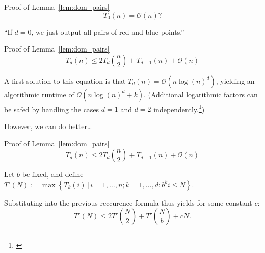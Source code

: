 \begin{frame}{Proof of Lemma~\ref{lem:dom_pairs}}
    \[
        T_0(n) = \mathcal{O}\left( n \right)?
    \]

    ``If $d = 0$, we just output all pairs of red and blue points.''


\end{frame}

\begin{frame}{Proof of Lemma~\ref{lem:dom_pairs}}
    \[
        T_d(n) \leq 2 T_d\left( \frac{n}{2} \right) + T_{d - 1}(n) + \mathcal{O}(n)
    \]

    A first solution to this equation is that $T_d(n) = \mathcal{O}\left( n {\log(n)}^d \right)$, yielding an algorithmic runtime of $\mathcal{O}\left( n {\log(n)}^d + k \right)$. (Additional logarithmic factors can be safed by handling the cases $d = 1$ and $d = 2$ independently.\footnote[1]{\cite{Chan2007}})

    However, we can do better\dots
\end{frame}

\begin{frame}{Proof of Lemma~\ref{lem:dom_pairs}}
    \[
        T_d(n) \leq 2 T_d\left( \frac{n}{2} \right) + T_{d - 1}(n) + \mathcal{O}(n)
    \]

    Let $b$ be fixed, and define $T'(N) := \max \left\{ T_k(i) \,|\, i = 1, \dots, n; k = 1, \dots, d: b^k i \leq N \right\}$.
    
    Substituting into the previous reccurence formula thus yields for some constant $c$:
    \[
        T'(N) \leq 2 T'\left( \frac{N}{2} \right) + T'\left( \frac{N}{b} \right) + cN.
    \]
    
\end{frame}

